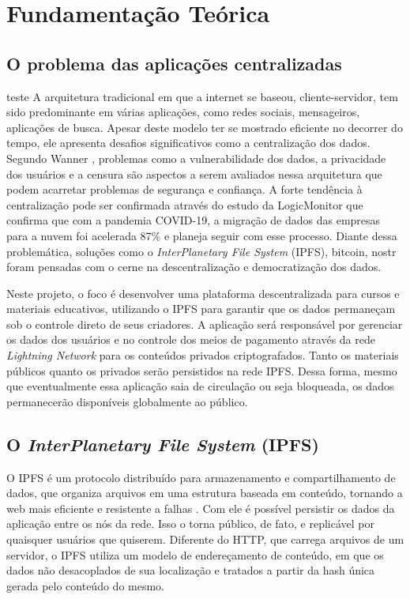 \chapter[Fundamentação Teórica]{Fundamentação Teórica}

\section{O problema das aplicações centralizadas}
teste
A arquitetura tradicional em que a internet se baseou, cliente-servidor, tem sido predominante em várias aplicações, como redes sociais, mensageiros, aplicações de busca. Apesar deste modelo ter se mostrado eficiente no decorrer do tempo, ele apresenta desafios significativos como a centralização dos dados. Segundo Wanner \cite{wanner2024}, problemas como a vulnerabilidade dos dados, a privacidade dos usuários e a censura são aspectos a serem avaliados nessa arquitetura que podem acarretar problemas de segurança e confiança. A forte tendência à centralização pode ser confirmada através do estudo da LogicMonitor \cite{logicmonitor2023} que confirma que com a pandemia COVID-19, a migração de dados das empresas para a nuvem foi acelerada 87\% e planeja seguir com esse processo. Diante dessa problemática, soluções como o \textit{InterPlanetary File System} (IPFS), bitcoin, nostr foram pensadas com o cerne na descentralização e democratização dos dados.

Neste projeto, o foco é desenvolver uma plataforma descentralizada para cursos e materiais educativos, utilizando o IPFS para garantir que os dados permaneçam sob o controle direto de seus criadores. A aplicação será responsável por gerenciar os dados dos usuários e no controle dos meios de pagamento através da rede  \textit{Lightning Network} \cite{lightningnetwork} para os conteúdos privados criptografados. Tanto os materiais públicos quanto os privados serão persistidos na rede IPFS. Dessa forma, mesmo que eventualmente essa aplicação saia de circulação ou seja bloqueada, os dados permanecerão disponíveis globalmente ao público.


\section{O \textit{InterPlanetary File System} (IPFS)}
O IPFS é um protocolo distribuído para armazenamento e compartilhamento de dados, que organiza arquivos em uma estrutura baseada em conteúdo, tornando a web mais eficiente e resistente a falhas \cite{ipfs2025}. Com ele é possível persistir os dados da aplicação entre os nós da rede. Isso o torna público, de fato, e replicável por quaisquer usuários que quiserem. Diferente do HTTP, que carrega arquivos de um servidor, o IPFS utiliza um modelo de endereçamento de conteúdo, em que os dados não desacoplados de sua localização e tratados a partir da hash única gerada pelo conteúdo do mesmo.

